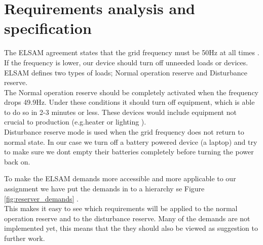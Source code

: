 \chapter[Requirements]{Requirements analysis and specification}
\label{chap:requirements}
The ELSAM agreement states that the grid frequency must be 50Hz at all times . If the frequency is lower, our device should turn off unneeded loads or devices. ELSAM defines two types of loads; Normal operation reserve and Disturbance reserve.\\
The Normal operation reserve should be completely activated when the frequency drops 49.9Hz. Under these conditions it should turn off equipment, which is able to do so in 2-3 minutes or less. These devices would include equipment not crucial to production (e.g.heater or lighting ).\\ 
Disturbance reserve mode is used when the grid frequency does not return to normal state. In our case we turn off a battery powered device (a laptop) and try to make sure we dont empty their batteries completely before turning the power back on.

To make the ELSAM demands more accessible and more applicable to our assignment we have put the demands in to a hierarchy se Figure \ref{fig:reserver_demands} .\\ This makes it easy to see which requirements will be applied to the normal operation reserve and to the disturbance reserve. Many of the demands are not implemented yet, this means that the they should also be viewed as suggestion to further work.

